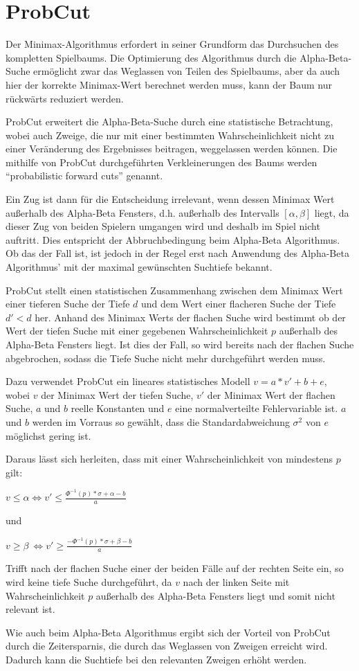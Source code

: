 \section{ProbCut}

Der Minimax-Algorithmus erfordert in seiner Grundform das Durchsuchen des kompletten Spielbaums.
Die Optimierung des Algorithmus durch die Alpha-Beta-Suche ermöglicht zwar das Weglassen von Teilen des Spielbaums, aber da auch hier der korrekte Minimax-Wert berechnet werden muss, kann der Baum nur rückwärts reduziert werden.

ProbCut erweitert die Alpha-Beta-Suche durch eine statistische Betrachtung, wobei auch Zweige, die nur mit einer bestimmten Wahrscheinlichkeit nicht zu einer Veränderung des Ergebnisses beitragen, weggelassen werden können.
Die mithilfe von ProbCut durchgeführten Verkleinerungen des Baums werden "`probabilistic forward cuts"' genannt.

Ein Zug ist dann für die Entscheidung irrelevant, wenn dessen Minimax Wert außerhalb des Alpha-Beta Fensters, d.h. außerhalb des Intervalls \([\alpha,\beta]\) liegt, da dieser Zug von beiden Spielern umgangen wird und deshalb im Spiel nicht auftritt.
Dies entspricht der Abbruchbedingung beim Alpha-Beta Algorithmus.
Ob das der Fall ist, ist jedoch in der Regel erst nach Anwendung des Alpha-Beta Algorithmus' mit der maximal gewünschten Suchtiefe bekannt.

ProbCut stellt einen statistischen Zusammenhang zwischen dem Minimax Wert einer tieferen Suche der Tiefe \(d\) und dem Wert einer flacheren Suche der Tiefe \(d'<d\) her.
Anhand des Minimax Werts der flachen Suche wird bestimmt ob der Wert der tiefen Suche mit einer gegebenen Wahrscheinlichkeit \(p\) außerhalb des Alpha-Beta Fensters liegt.
Ist dies der Fall, so wird bereits nach der flachen Suche abgebrochen, sodass die Tiefe Suche nicht mehr durchgeführt werden muss.

Dazu verwendet ProbCut ein lineares statistisches Modell \(v=a*v'+b+e\), wobei \(v\) der Minimax Wert der tiefen Suche, \(v'\) der Minimax Wert der flachen Suche, \(a\) und \(b\) reelle Konstanten und \(e\) eine normalverteilte Fehlervariable ist.
\(a\) und \(b\) werden im Vorraus so gewählt, dass die Standardabweichung \(\sigma^{2}\) von \(e\) möglichst gering ist.

Daraus lässt sich herleiten, dass mit einer Wahrscheinlichkeit von mindestens \(p\) gilt:

\(v\leq\alpha \iff v'\leq\frac{\Phi^{-1}(p)*\sigma+\alpha-b}{a}\)

und

\(v\geq\beta\ \iff v'\geq\frac{-\Phi^{-1}(p)*\sigma+\beta-b}{a}\)

Trifft nach der flachen Suche einer der beiden Fälle auf der rechten Seite ein, so wird keine tiefe Suche durchgeführt, da \(v\) nach der linken Seite mit Wahrscheinlichkeit \(p\) außerhalb des Alpha-Beta Fensters liegt
und somit nicht relevant ist.

Wie auch beim Alpha-Beta Algorithmus ergibt sich der Vorteil von ProbCut durch die Zeitersparnis, die durch das Weglassen von Zweigen erreicht wird. Dadurch kann die Suchtiefe bei den relevanten Zweigen erhöht werden.
\cite[S.~1]{probcut}
